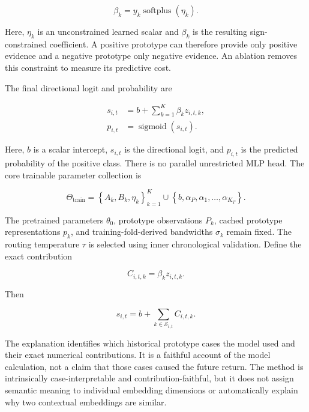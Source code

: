 \documentclass[11pt]{article}
\newcommand{\sigmoid}{\operatorname{sigmoid}}
\begin{document}
\begin{equation}
\beta_k
=
y_k\operatorname{softplus}(\eta_k).
\end{equation}

Here, $\eta_k$ is an unconstrained learned scalar and $\beta_k$ is the resulting
sign-constrained coefficient. A positive prototype can therefore provide only
positive evidence and a negative prototype only negative evidence. An ablation
removes this constraint to measure its predictive cost.

The final directional logit and probability are

\begin{align}
s_{i,t}
&=
b+\sum_{k=1}^{K}\beta_kz_{i,t,k},
\\
p_{i,t}
&=
\sigmoid(s_{i,t}).
\end{align}

Here, $b$ is a scalar intercept, $s_{i,t}$ is the directional logit, and
$p_{i,t}$ is the predicted probability of the positive class. There is no
parallel unrestricted MLP head. The core trainable parameter collection is

\begin{equation}
\Theta_{\mathrm{train}}
=
\left\{
A_k,B_k,\eta_k
\right\}_{k=1}^{K}
\cup
\left\{
b,\alpha_P,\alpha_1,\ldots,\alpha_{K_T}
\right\}.
\end{equation}

The pretrained parameters $\theta_0$, prototype observations $P_k$, cached
prototype representations $p_k$, and training-fold-derived bandwidths
$\sigma_k$ remain fixed. The routing temperature $\tau$ is selected using
inner chronological validation. Define the exact contribution

\begin{equation}
C_{i,t,k}
=
\beta_kz_{i,t,k}.
\end{equation}

Then

\begin{equation}
s_{i,t}
=
b+
\sum_{k\in\mathcal S_{i,t}}
C_{i,t,k}.
\end{equation}

The explanation identifies which historical prototype cases the model used
and their exact numerical contributions. It is a faithful account of the model
calculation, not a claim that those cases caused the future return. The method
is intrinsically case-interpretable and contribution-faithful, but it does not
assign semantic meaning to individual embedding dimensions or automatically
explain why two contextual embeddings are similar.
\end{document}
